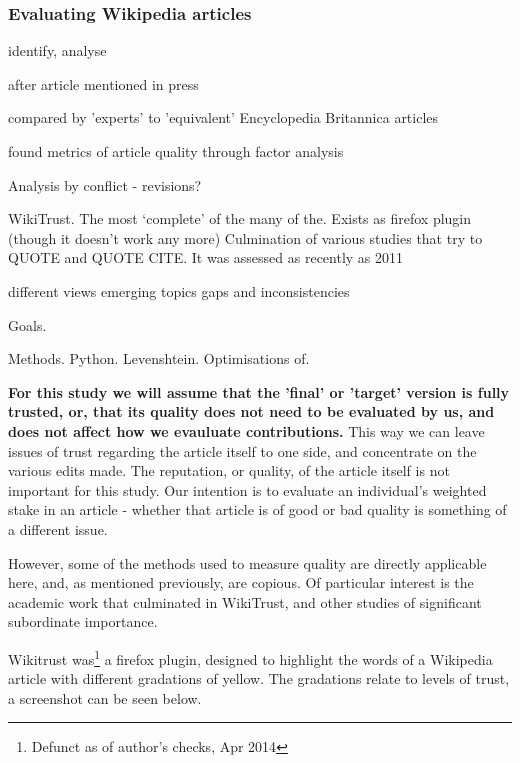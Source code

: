 \documentclass[a4paper,11pt,twoside,notitlepage]{article}
\begin{document}
        \subsubsection{Evaluating Wikipedia articles}
        identify, analyse

        after article mentioned in press \cite{Lih2004}

        compared by 'experts' to 'equivalent' Encyclopedia Britannica articles \cite{Giles2005}

        found metrics of article quality through factor analysis
        \cite{Stvilia2005}

        Analysis by conflict - revisions?\cite{Kittur2007}

        WikiTrust. The most `complete' of the many of the. Exists as
        firefox plugin (though it doesn't work any more) Culmination
        of various studies that try to QUOTE \cite{Adler2007} and QUOTE CITE. It
        was assessed as recently as 2011 \cite{Lucassen2011}
       
        different views emerging topics gaps and inconsistencies

        Goals.

        Methods. Python. Levenshtein. Optimisations of.
     
        \textbf{For this study we will assume that the 'final' or
          'target' version is fully trusted, or, that its quality does
          not need to be evaluated by us, and does not affect how we
          evauluate contributions.} This way we can leave issues of
        trust regarding the article itself to one side, and
        concentrate on the various edits made. The reputation, or
        quality, of the article itself is not important for this
        study. Our intention is to evaluate an individual's weighted
        stake in an article - whether that article is of good or bad
        quality is something of a different issue.

        However, some of the methods used to measure quality are
        directly applicable here, and, as mentioned previously, are
        copious. Of particular interest is the academic work that
        culminated in WikiTrust,\cite{Adler2006}\cite{Adler2007} and
        other studies of significant subordinate
        importance.\cite{Zeng2006}\cite{Cross2006}

        Wikitrust was\footnote{Defunct as of author's checks, Apr
          2014} a firefox plugin, designed to highlight the
        words of a Wikipedia article with different gradations of
        yellow. The gradations relate to levels of trust, a screenshot
        can be seen below.
        
\end{document}
